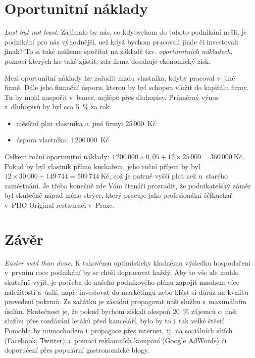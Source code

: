 \section{Oportunitní náklady}
\textit{Last but not least}. Zajímalo by nás, co kdybychom do tohoto podnikání nešli, je podnikání pro nás výhodnější, než když bychom pracovali jinde či investovali jinak? To si také můžeme spočítat na základě tzv. \textit{oportunitních nákladech}\cite{kubicek}, pomocí kterých lze také zjistit, zda firma dosahuje ekonomický zisk.

Mezi oportunitní náklady lze zařadit mzdu vlastníka, kdyby pracoval v~jiné firmě. Dále jeho finanční úsporu, kterou by byl schopen vložit do kapitálu firmy. Tu by mohl naspořit v~bance, nejlépe přes dluhopisy. Průměrný výnos z~dluhopisů by byl cca 5~\% za rok.

\begin{itemize}
\item měsíční plat vlastníka u~jiné firmy: 25\,000~Kč
\item úspora vlastníka: 1\,200\,000~Kč
\end{itemize}

Celkem roční oportunitní náklady: $1\,200\,000 \times 0,05 + 12 \times 25\,000 = 360\,000~\text{Kč}$. Pokud by byl vlastník přímo kuchařem, jeho roční příjem by byl $12 \times 30\,000 + 149\,744 = 509\,744~\text{Kč}$, což je patrně vyšší plat než u~starého zaměstnání. Je třeba konečně zde Vám čtenáři prozradit, že podnikatelský záměr byl skutečně nápad mého strýce, který pracuje jako profesionální šéfkuchař v~PHO Original restauraci v~Praze.

\newpage




\section*{Závěr}
\textit{Easier said than done}. K takovému optimisticky kladnému výsledku hospodaření v~prvním roce podnikání by se chtěl dopracovat každý. Aby to vše ale mohlo skutečně vyjít, je potřeba do našeho podnikového plánu zapojit mnohem více náležitostí a~úsilí, např. investovat do marketingu nebo klást si důraz na kvalitu provedení pokrmů. Ze začátku je zásadní propagovat naši službu s~maximálním úsilím. Skutečnost je, že pokud bychom získali alespoň 20~\% zájemců o~naši službu přes rozdávání letáků před kanceláří, bylo by to i~tak velké štěstí. Pomohla by mimochodem i~propagace přes internet, tj. na sociálních sítích (Facebook, Twitter) a~pomocí reklamních kampaní (Google AdWords) či doporučení přes populární gastronomické blogy.

